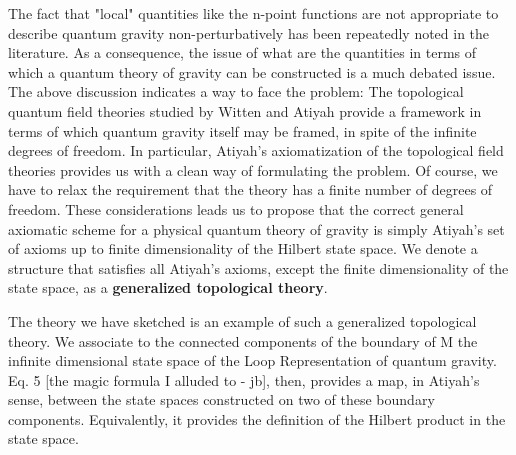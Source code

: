 The fact that "local" quantities like the n-point functions are not
appropriate to describe quantum gravity non-perturbatively has been
repeatedly noted in the literature.  As a consequence, the issue of
what are the quantities in terms of which a quantum theory of gravity can be
constructed is a much debated issue. The above discussion indicates
a way to face the problem: The topological quantum field theories studied by
Witten and Atiyah provide a framework in terms of which quantum gravity
itself may be framed, in spite of the infinite degrees of freedom.  In
particular, Atiyah's axiomatization of the topological field theories
provides us with a clean way of formulating the problem.  Of course, we
have to relax the requirement that the theory has a finite number of
degrees of freedom.  These considerations leads us to propose that the
correct general axiomatic scheme for a physical quantum theory of
gravity is simply Atiyah's set of axioms up to finite dimensionality
of the Hilbert state space. We denote a structure that satisfies all
Atiyah's axioms, except the finite dimensionality of the state space,  as
a \textbf{generalized topological theory}. 

The theory we have sketched is an example of such a generalized topological
theory. We associate to the connected
components of the boundary of M the infinite
dimensional state space of the Loop Representation of quantum
gravity.  Eq. 5 [the magic formula I alluded to - jb], then, provides a map,
in Atiyah's sense, between the state spaces constructed on two of these
boundary components. Equivalently, it provides the definition of the Hilbert
product in the state space.

